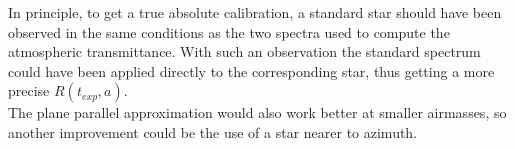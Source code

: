 \documentclass[a4paper]{article}
\begin{document}
\begin{multicols}{2}
			In principle, to get a true absolute calibration, a standard star should have been observed in the same conditions as the two spectra used to compute the atmospheric transmittance. With such an observation the standard spectrum could have been applied directly to the corresponding star, thus getting a more precise $R(t_{exp}, a)$.\\
			
			The plane parallel approximation would also work better at smaller airmasses, so another improvement could be the use of a star nearer to azimuth.
			
		
	\end{multicols}
\end{document}
